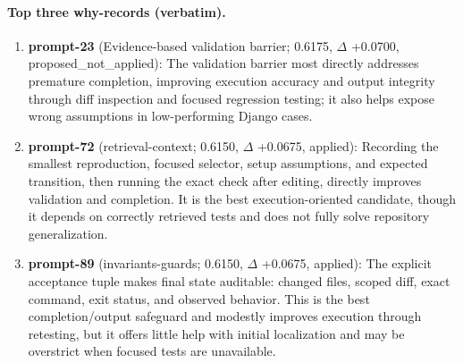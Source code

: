 \paragraph{Top three why-records (verbatim).}\begin{enumerate}\itemsep1pt
\item \textbf{prompt-23} (Evidence-based validation barrier; 0.6175, $\Delta$ +0.0700, proposed\_not\_applied): The validation barrier most directly addresses premature completion, improving execution accuracy and output integrity through diff inspection and focused regression testing; it also helps expose wrong assumptions in low-performing Django cases.
\item \textbf{prompt-72} (retrieval-context; 0.6150, $\Delta$ +0.0675, applied): Recording the smallest reproduction, focused selector, setup assumptions, and expected transition, then running the exact check after editing, directly improves validation and completion. It is the best execution-oriented candidate, though it depends on correctly retrieved tests and does not fully solve repository generalization.
\item \textbf{prompt-89} (invariants-guards; 0.6150, $\Delta$ +0.0675, applied): The explicit acceptance tuple makes final state auditable: changed files, scoped diff, exact command, exit status, and observed behavior. This is the best completion/output safeguard and modestly improves execution through retesting, but it offers little help with initial localization and may be overstrict when focused tests are unavailable.
\end{enumerate}
